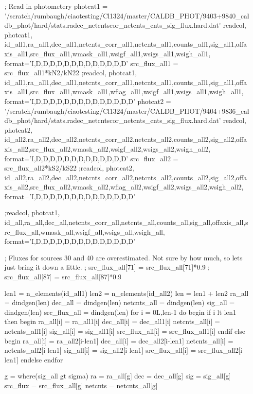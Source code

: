 ; Read in photometery
photcat1 = '/scratch/rumbaugh/ciaotesting/Cl1324/master/CALDB_PHOT/9403+9840_caldb_phot/hard/stats.radec_netcntscor_netcnts_cnts_sig_flux.hard.dat'
readcol, photcat1, id_all1,ra_all1,dec_all1,netcnts_corr_all1,netcnts_all1,counts_all1,sig_all1,offaxis_all1,src_flux_all1,wmask_all1,wsigf_all1,wsigs_all1,wsigh_all1, format='I,D,D,D,D,D,D,D,D,D,D,D,D,D'
src_flux_all1 = src_flux_all1*kN2/kN22
;readcol, photcat1, id_all1,ra_all1,dec_all1,netcnts_corr_all1,netcnts_all1,counts_all1,sig_all1,offaxis_all1,src_flux_all1,wmask_all1,wflag_all1,wsigf_all1,wsigs_all1,wsigh_all1, format='I,D,D,D,D,D,D,D,D,D,D,D,D,D,D'
photcat2 = '/scratch/rumbaugh/ciaotesting/Cl1324/master/CALDB_PHOT/9404+9836_caldb_phot/hard/stats.radec_netcntscor_netcnts_cnts_sig_flux.hard.dat'
readcol, photcat2, id_all2,ra_all2,dec_all2,netcnts_corr_all2,netcnts_all2,counts_all2,sig_all2,offaxis_all2,src_flux_all2,wmask_all2,wsigf_all2,wsigs_all2,wsigh_all2, format='I,D,D,D,D,D,D,D,D,D,D,D,D,D'
src_flux_all2 = src_flux_all2*kS2/kS22
;readcol, photcat2, id_all2,ra_all2,dec_all2,netcnts_corr_all2,netcnts_all2,counts_all2,sig_all2,offaxis_all2,src_flux_all2,wmask_all2,wflag_all2,wsigf_all2,wsigs_all2,wsigh_all2, format='I,D,D,D,D,D,D,D,D,D,D,D,D,D,D'

;readcol, photcat1, id_all,ra_all,dec_all,netcnts_corr_all,netcnts_all,counts_all,sig_all,offaxis_all,src_flux_all,wmask_all,wsigf_all,wsigs_all,wsigh_all, format='I,D,D,D,D,D,D,D,D,D,D,D,D,D,D'

; Fluxes for sources 30 and 40 are overestimated.  Not sure by how much, so lets just bring it down a little.
; src_flux_all[71] = src_flux_all[71]*0.9
; src_flux_all[87] = src_flux_all[87]*0.9

len1 = n_elements(id_all1)
len2 = n_elements(id_all2)
len = len1 + len2
ra_all = dindgen(len)
dec_all = dindgen(len)
netcnts_all = dindgen(len)
sig_all = dindgen(len)
src_flux_all = dindgen(len)
for i = 0L,len-1 do begin
   if i lt len1 then begin
      ra_all[i] = ra_all1[i]
      dec_all[i] = dec_all1[i]
      netcnts_all[i] = netcnts_all1[i]
      sig_all[i] = sig_all1[i]
      src_flux_all[i] = src_flux_all1[i]
   endif else begin
      ra_all[i] = ra_all2[i-len1]
      dec_all[i] = dec_all2[i-len1]
      netcnts_all[i] = netcnts_all2[i-len1]
      sig_all[i] = sig_all2[i-len1]
      src_flux_all[i] = src_flux_all2[i-len1]
   endelse   
endfor


g = where(sig_all gt sigma)
ra = ra_all[g]
dec = dec_all[g]
sig = sig_all[g]
src_flux = src_flux_all[g]
netcnts = netcnts_all[g]  

